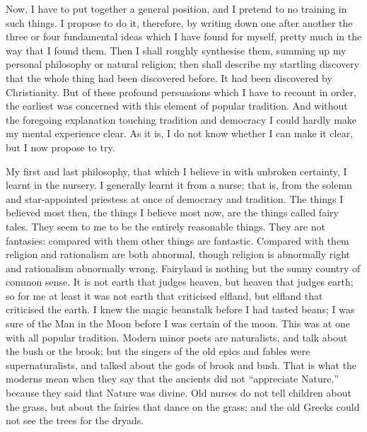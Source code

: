 Now, I have to put together a general position, and I pretend to no training in such things. I propose to do it, therefore, by writing down one after another the three or four fundamental ideas which I have found for myself, pretty much in the way that I found them. Then I shall roughly synthesise them, summing up my personal philosophy or natural religion; then shall describe my startling discovery that the whole thing had been discovered before. It had been discovered by Christianity. But of these profound persuasions which I have to recount in order, the earliest was concerned with this element of popular tradition. And without the foregoing explanation touching tradition and democracy I could hardly make my mental experience clear. As it is, I do not know whether I can make it clear, but I now propose to try.

My first and last philosophy, that which I believe in with unbroken certainty, I learnt in the nursery. I generally learnt it from a nurse; that is, from the solemn and star-appointed priestess at once of democracy and tradition. The things I believed most then, the things I believe most now, are the things called fairy tales. They seem to me to be the entirely reasonable things. They are not fantasies: compared with them other things are fantastic. Compared with them religion and rationalism are both abnormal, though religion is abnormally right and rationalism abnormally wrong. Fairyland is nothing but the sunny country of common sense. It is not earth that judges heaven, but heaven that judges earth; so for me at least it was not earth that criticised elfland, but elfland that criticised the earth. I knew the magic beanstalk before I had tasted beans; I was sure of the Man in the Moon before I was certain of the moon. This was at one with all popular tradition. Modern minor poets are naturalists, and talk about the bush or the brook; but the singers of the old epics and fables were supernaturalists, and talked about the gods of brook and bush. That is what the moderns mean when they say that the ancients did not “appreciate Nature,” because they said that Nature was divine. Old nurses do not tell children about the grass, but about the fairies that dance on the grass; and the old Greeks could not see the trees for the dryads.

